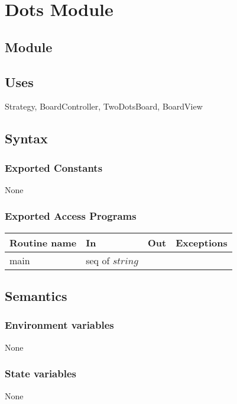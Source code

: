 \documentclass[12pt]{article}
\begin{document}
\newpage

\section* {Dots Module}

\subsection* {Module}


\subsection*{Uses}
Strategy, BoardController, TwoDotsBoard, BoardView

\subsection* {Syntax}

\subsubsection* {Exported Constants}

None

\subsubsection* {Exported Access Programs}

\begin{tabular}{| l | l | l | p{6cm} |}
\hline
\textbf{Routine name} & \textbf{In} & \textbf{Out} & \textbf{Exceptions}\\
\hline
main & seq of $string$ & & \\
\hline
\end{tabular}

\subsection* {Semantics}

\subsubsection* {Environment variables}
None

\subsubsection* {State variables}
None
\end{document}
